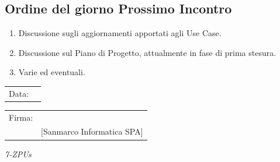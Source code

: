 \documentclass[a4paper,12pt]{article}
\begin{document}
\subsection{Ordine del giorno Prossimo Incontro}
\begin{enumerate}
    \item Discussione sugli aggiornamenti apportati agli Use Case.
    \item Discussione sul Piano di Progetto, attualmente in fase di prima stesura.
    \item Varie ed eventuali.
\end{enumerate}

\vfill


\begin{flushleft}
\begin{tabular}{@{}p{0.5in}p{2in}@{}}
Data: & \hrulefill \\
\end{tabular}

\vspace{1em}

\begin{tabular}{@{}p{0.5in}p{2in}@{}}
Firma: & \hrulefill \\
& [Sanmarco Informatica SPA] \\
\end{tabular}
\end{flushleft}

\begin{flushright}
    \textit{7-ZPUs}
\end{flushright}
\end{document}
